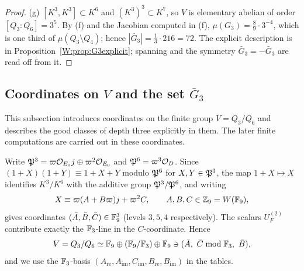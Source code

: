 \begin{proof}
(g) $[K^3,K^3]\subset K^6$ and $(K^3)^3\subset K^7$, so $V$ is
elementary abelian of order $[Q_3:Q_6]=3^5$.  By (f) and the
Jacobian computed in (f), $\mu(G_3)=\tfrac89\cdot3^{-4}$, which is
one third of $\mu(Q_3\setminus Q_4)$; hence $|\bar G_3|=\tfrac13\cdot216=72$.
The explicit description is in Proposition~\ref{W:prop:G3explicit};
spanning and the symmetry $\bar G_3=-\bar G_3$ are read off from it.
\end{proof}

\subsection{Coordinates on $V$ and the set $\bar G_3$}
This subsection introduces coordinates on the finite group $V=Q_3/Q_6$ and describes the good classes of depth three explicitly in them. The later finite computations are carried out in these coordinates.

Write $\mathfrak P^3=\varpi\mathcal O_{E_0}j\oplus\varpi^2\mathcal O_{E_0}$ and
$\mathfrak P^6=\varpi^3\mathcal O_D$.  Since $(1+X)(1+Y)\equiv1+X+Y$ modulo
$\mathfrak P^6$ for $X,Y\in\mathfrak P^3$, the map $1+X\mapsto X$ identifies
$K^3/K^6$ with the additive group $\mathfrak P^3/\mathfrak P^6$, and writing
\[
 X\equiv\varpi(A+B\varpi)j+\varpi^2C,\qquad A,B,C\in\mathbb Z_9=W(\mathbb F_9),
\]
gives coordinates $(\bar A,\bar B,\bar C)\in\mathbb F_9^3$ (levels $3,5,4$
respectively).  The scalars $U_F^{(2)}$ contribute exactly the
$\mathbb F_3$-line in the $C$-coordinate.  Hence
\begin{equation}\label{W:eq:Vcoords}
 V=Q_3/Q_6\simeq\mathbb F_9\oplus(\mathbb F_9/\mathbb F_3)\oplus\mathbb F_9\ni(\bar A,\ \bar C\bmod\mathbb F_3,\ \bar B),
\end{equation}
and we use the $\mathbb F_3$-basis $(A_{\mathrm{re}},A_{\mathrm{im}},C_{\mathrm{im}},B_{\mathrm{re}},B_{\mathrm{im}})$
in the tables.

